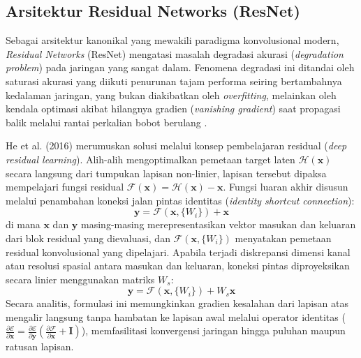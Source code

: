 \subsection{Arsitektur Residual Networks (ResNet)} \label{II.Teori.ResNet}
Sebagai arsitektur kanonikal yang mewakili paradigma konvolusional modern, \textit{Residual Networks} (ResNet) \cite{he2016deep} mengatasi masalah degradasi akurasi (\textit{degradation problem}) pada jaringan yang sangat dalam. Fenomena degradasi ini ditandai oleh saturasi akurasi yang diikuti penurunan tajam performa seiring bertambahnya kedalaman jaringan, yang bukan diakibatkan oleh \textit{overfitting}, melainkan oleh kendala optimasi akibat hilangnya gradien (\textit{vanishing gradient}) saat propagasi balik melalui rantai perkalian bobot berulang \cite{he2016deep}. \par

He et al. (2016) \cite{he2016deep} merumuskan solusi melalui konsep pembelajaran residual (\textit{deep residual learning}). Alih-alih mengoptimalkan pemetaan target laten $\mathcal{H}(\mathbf{x})$ secara langsung dari tumpukan lapisan non-linier, lapisan tersebut dipaksa mempelajari fungsi residual $\mathcal{F}(\mathbf{x}) = \mathcal{H}(\mathbf{x}) - \mathbf{x}$. Fungsi luaran akhir disusun melalui penambahan koneksi jalan pintas identitas (\textit{identity shortcut connection}):
\begin{equation}
	\mathbf{y} = \mathcal{F}(\mathbf{x}, \{W_i\}) + \mathbf{x}
\end{equation}
di mana $\mathbf{x}$ dan $\mathbf{y}$ masing-masing merepresentasikan vektor masukan dan keluaran dari blok residual yang dievaluasi, dan $\mathcal{F}(\mathbf{x}, \{W_i\})$ menyatakan pemetaan residual konvolusional yang dipelajari. Apabila terjadi diskrepansi dimensi kanal atau resolusi spasial antara masukan dan keluaran, koneksi pintas diproyeksikan secara linier menggunakan matriks $W_s$:
\begin{equation}
	\mathbf{y} = \mathcal{F}(\mathbf{x}, \{W_i\}) + W_s \mathbf{x}
\end{equation}
Secara analitis, formulasi ini memungkinkan gradien kesalahan dari lapisan atas mengalir langsung tanpa hambatan ke lapisan awal melalui operator identitas ($\frac{\partial \mathcal{E}}{\partial \mathbf{x}} = \frac{\partial \mathcal{E}}{\partial \mathbf{y}} \left( \frac{\partial \mathcal{F}}{\partial \mathbf{x}} + \mathbf{I} \right)$), memfasilitasi konvergensi jaringan hingga puluhan maupun ratusan lapisan. \par


